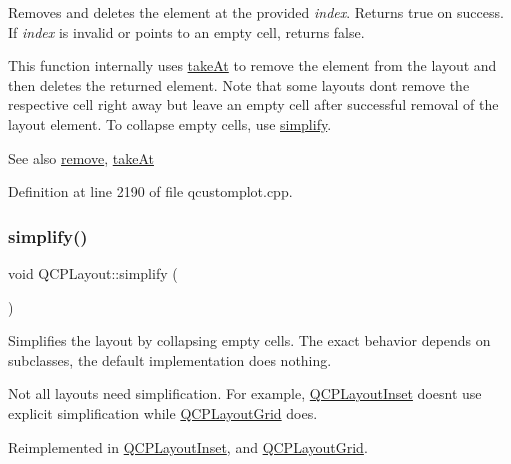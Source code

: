 Removes and deletes the element at the provided {\itshape index}. Returns true on success. If {\itshape index} is invalid or points to an empty cell, returns false.

This function internally uses \hyperlink{class_q_c_p_layout_a5a79621fa0a6eabb8b520cfc04fb601a}{take\+At} to remove the element from the layout and then deletes the returned element. Note that some layouts don\textquotesingle{}t remove the respective cell right away but leave an empty cell after successful removal of the layout element. To collapse empty cells, use \hyperlink{class_q_c_p_layout_a41e6ac049143866e8f8b4964efab01b2}{simplify}.

\begin{DoxySeeAlso}{See also}
\hyperlink{class_q_c_p_layout_a6c58f537d8086f352576ab7c5b15d0bc}{remove}, \hyperlink{class_q_c_p_layout_a5a79621fa0a6eabb8b520cfc04fb601a}{take\+At} 
\end{DoxySeeAlso}


Definition at line 2190 of file qcustomplot.\+cpp.

\mbox{\label{class_q_c_p_layout_a41e6ac049143866e8f8b4964efab01b2}} 
\subsubsection{\texorpdfstring{simplify()}{simplify()}}
{\footnotesize\ttfamily void Q\+C\+P\+Layout\+::simplify (\begin{DoxyParamCaption}{ }\end{DoxyParamCaption})\hspace{0.3cm}{\ttfamily [virtual]}}

Simplifies the layout by collapsing empty cells. The exact behavior depends on subclasses, the default implementation does nothing.

Not all layouts need simplification. For example, \hyperlink{class_q_c_p_layout_inset}{Q\+C\+P\+Layout\+Inset} doesn\textquotesingle{}t use explicit simplification while \hyperlink{class_q_c_p_layout_grid}{Q\+C\+P\+Layout\+Grid} does. 

Reimplemented in \hyperlink{class_q_c_p_layout_inset_abb9eb23bf2d7c587a8abe02d065eae0a}{Q\+C\+P\+Layout\+Inset}, and \hyperlink{class_q_c_p_layout_grid_a08bba60e4acd20165526a8fd7f986b58}{Q\+C\+P\+Layout\+Grid}.



